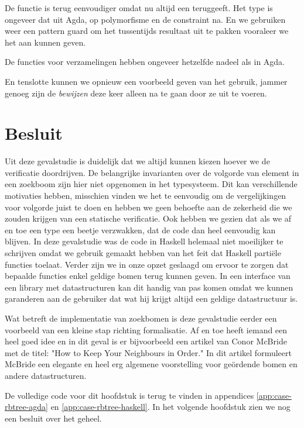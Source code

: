 De  functie is terug eenvoudiger omdat  nu altijd een
 teruggeeft. Het type is ongeveer dat uit Agda, op polymorfisme
en de  constraint na. En we gebruiken weer een pattern guard om het
tussentijds resultaat uit te pakken vooraleer we het aan  kunnen
geven.


De functies voor verzamelingen hebben ongeveer hetzelfde nadeel als in Agda.


En tenslotte kunnen we opnieuw een voorbeeld geven van het gebruik, jammer
genoeg zijn de \emph{bewijzen} deze keer alleen na te gaan door ze uit te
voeren.



\section{Besluit}

Uit deze gevalstudie is duidelijk dat we altijd kunnen kiezen hoever we de
verificatie doordrijven. De belangrijke invarianten over de volgorde van
element in een zoekboom zijn hier niet opgenomen in het typesysteem. Dit kan
verschillende motivaties hebben, misschien vinden we het te eenvoudig om de
vergelijkingen voor volgorde juist te doen en hebben we geen behoefte aan de
zekerheid die we zouden krijgen van een statische verificatie. Ook hebben we
gezien dat als we af en toe een type een beetje verzwakken, dat de code dan heel
eenvoudig kan blijven. In deze gevalstudie was de code in Haskell helemaal niet
moeilijker te schrijven omdat we gebruik gemaakt hebben van het feit dat
Haskell partiële functies toelaat. Verder zijn we in onze opzet geslaagd om
ervoor te zorgen dat bepaalde functies enkel geldige bomen terug kunnen geven.
In een interface van een library met datastructuren kan dit handig van pas
komen omdat we kunnen garanderen aan de gebruiker dat wat hij krijgt altijd een
geldige datastructuur is.

Wat betreft de implementatie van zoekbomen is deze gevalstudie eerder een
voorbeeld van een kleine stap richting formalisatie. Af en toe heeft iemand een
heel goed idee en in dit geval is er bijvoorbeeld een artikel van Conor
McBride \cite{hkynio} met de titel: "How to Keep Your Neighbours in Order."
In dit artikel formuleert McBride een elegante en heel erg algemene
voorstelling voor geördende bomen en andere datastructuren.

De volledige code voor dit hoofdstuk is terug te vinden in appendices
\ref{app:case-rbtree-agda} en \ref{app:case-rbtree-haskell}.
In het volgende hoofdstuk zien we nog een besluit over het geheel.
